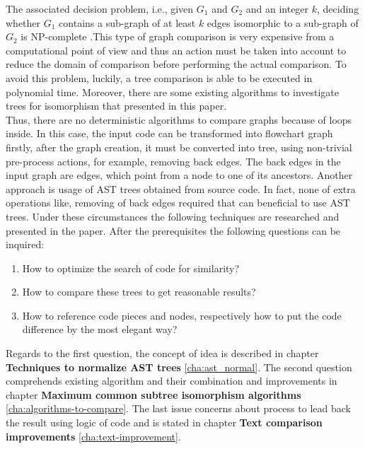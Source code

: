 \documentclass{report}
\begin{document}
The associated decision problem, i.e., given $ G_{1}$ and $ G_{2}$ and an integer $k$, deciding whether $ G_{1}$ contains a sub-graph of at least $k$ edges isomorphic to a sub-graph of $ G_{2}$ is NP-complete \cite{graph_isomorphism_is}.This type of graph comparison is very expensive from a computational point of view and thus an action must be taken into account to reduce the domain of comparison before performing the actual comparison. To avoid this problem, luckily, a tree comparison is able to be executed in polynomial time. Moreover, there are some existing algorithms to investigate trees for isomorphism that presented in this paper.\\
Thus, there are no deterministic algorithms to compare graphs because of loops inside. In this case, the input code can be transformed into flowchart graph firstly, after the graph creation, it must be converted into tree, using non-trivial pre-process actions, for example, removing back edges. The back edges in the input graph are edges, which point from a node to one of its ancestors. Another approach is usage of AST trees obtained from source code. In fact, none of extra operations like, removing of back edges required that can beneficial to use AST trees.
\newpage
Under these circumstances the following techniques are researched and presented in the paper.
After the prerequisites the following questions can be inquired:
\begin{enumerate}
 \item How to optimize the search of code for similarity?  
  \item How to compare these trees to get reasonable results?
  \item How to reference code pieces and nodes, respectively how to put the code difference by the most elegant way?
\end{enumerate}

Regards to the first question, the concept of idea is described in chapter \textbf{Techniques to normalize AST trees} \ref{cha:ast_normal}. The second question comprehends existing algorithm and their combination and improvements in chapter \textbf{Maximum common subtree isomorphism algorithms} \ref{cha:algorithms-to-compare}. The last issue concerns about process to lead back the result using logic of code and is stated in chapter \textbf{Text comparison improvements} \ref{cha:text-improvement}.

\end{document}
